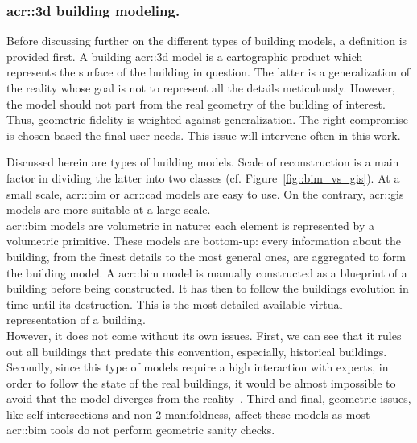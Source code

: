         \subsubsection{\texorpdfstring{\gls*{acr::3d}}{3D} building modeling.}
            Before discussing further on the different types of building models, a definition is provided first.
            A building \gls{acr::3d} model is a cartographic product which represents the surface of the building in question.
            The latter is a generalization of the reality whose goal is not to represent all the details meticulously.
            However, the model should not part from the real geometry of the building of interest.
            Thus, geometric fidelity is weighted against generalization.
            The right compromise is chosen based the final user needs.
            This issue will intervene often in this work.

            Discussed herein are types of building models.
            Scale of reconstruction is a main factor in dividing the latter into two classes (cf. Figure~\ref{fig::bim_vs_gis}).
            At a small scale, \gls{acr::bim} or \gls{acr::cad} models are easy to use.
            On the contrary, \gls{acr::gis} models are more suitable at a large-scale.\\

            \gls{acr::bim} models are volumetric in nature:
            each element is represented by a volumetric primitive.
            These models are bottom-up: every information about the building, from the finest details to the most general ones, are aggregated to form the building model.
            A \gls{acr::bim} model is manually constructed as a blueprint of a building before being constructed.
            It has then to follow the buildings evolution in time until its destruction.
            This is the most detailed available virtual representation of a building.\\
            However, it does not come without its own issues.
            First, we can see that it rules out all buildings that predate this convention, especially, historical buildings.
            Secondly, since this type of models require a high interaction with experts, in order to follow the state of the real buildings, it would be almost impossible to avoid that the model diverges from the reality~\parencite{puatruaucean2015state}.
            Third and final, geometric issues, like self-intersections and non 2-manifoldness, affect these models as most \gls{acr::bim} tools do not perform geometric sanity checks.\\

